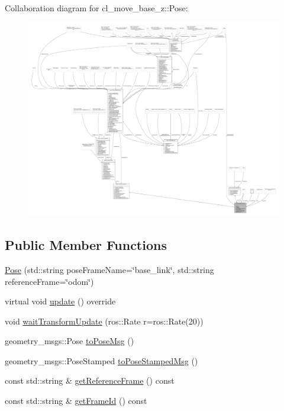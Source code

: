 Collaboration diagram for cl\+\_\+move\+\_\+base\+\_\+z\+:\+:Pose\+:
\nopagebreak
\begin{figure}[H]
\begin{center}
\leavevmode
\includegraphics[width=350pt]{classcl__move__base__z_1_1Pose__coll__graph}
\end{center}
\end{figure}
\subsection*{Public Member Functions}
\begin{DoxyCompactItemize}
\item 
\hyperlink{classcl__move__base__z_1_1Pose_aa361cd1347cfead0f244045fe183c600}{Pose} (std\+::string pose\+Frame\+Name=\char`\"{}base\+\_\+link\char`\"{}, std\+::string reference\+Frame=\char`\"{}odom\char`\"{})
\item 
virtual void \hyperlink{classcl__move__base__z_1_1Pose_abf99d1127cf51a93f97ada2031196114}{update} () override
\item 
void \hyperlink{classcl__move__base__z_1_1Pose_a5f8576c3dacfb2f2e7f9df5105c480ea}{wait\+Transform\+Update} (ros\+::\+Rate r=ros\+::\+Rate(20))
\item 
geometry\+\_\+msgs\+::\+Pose \hyperlink{classcl__move__base__z_1_1Pose_a9faf8c6b437ff6b19c8bddd692908dca}{to\+Pose\+Msg} ()
\item 
geometry\+\_\+msgs\+::\+Pose\+Stamped \hyperlink{classcl__move__base__z_1_1Pose_a63887a88c1ac6e9a4a71b8d7d11aed6c}{to\+Pose\+Stamped\+Msg} ()
\item 
const std\+::string \& \hyperlink{classcl__move__base__z_1_1Pose_af8c2dc151e74aa8da6b283d1c8563051}{get\+Reference\+Frame} () const
\item 
const std\+::string \& \hyperlink{classcl__move__base__z_1_1Pose_aa3c4adc72922e5385f4586e6e798db23}{get\+Frame\+Id} () const
\end{DoxyCompactItemize}
